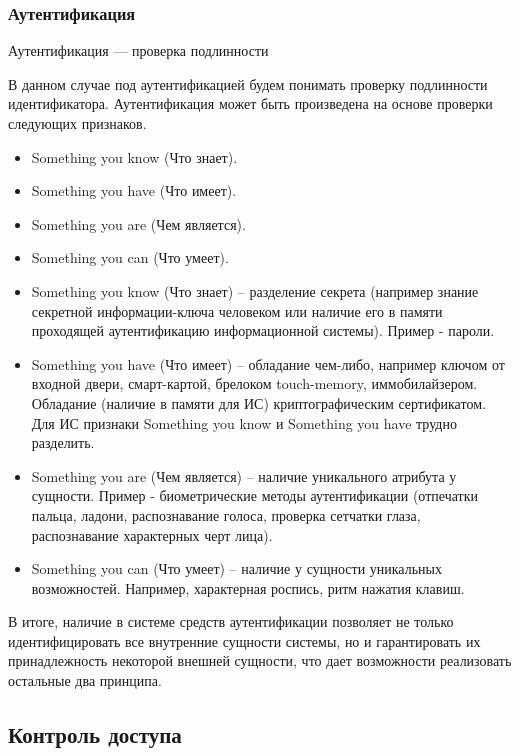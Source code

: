 \begin{frame}
\frametitle{Аутентификация}
\begin{definition}%
\alert{Аутентификация} --- проверка подлинности
\end{definition}
В данном случае под аутентификацией будем понимать проверку подлинности идентификатора. Аутентификация может быть произведена на основе проверки следующих признаков.
\begin{itemize}
    \item Something you know (Что знает).
    \item Something you have (Что имеет).
    \item Something you are (Чем является).
    \item Something you can (Что умеет).
\end{itemize}
\end{frame}


\begin{itemize}
\item Something you know (Что знает) – разделение секрета (например знание секретной информации-ключа человеком или наличие его в памяти проходящей аутентификацию информационной системы). Пример - пароли.
\item Something you have (Что имеет) – обладание чем-либо, например ключом от входной двери, смарт-картой, брелоком touch-memory, иммобилайзером. Обладание (наличие в памяти для ИС) криптографическим сертификатом. Для ИС признаки Something you know и Something you have трудно разделить.
\item Something you are (Чем является) – наличие уникального атрибута у сущности. Пример - биометрические методы аутентификации (отпечатки пальца, ладони, распознавание голоса, проверка сетчатки глаза, распознавание характерных черт лица).
\item Something you can (Что умеет) – наличие у сущности уникальных возможностей. Например, характерная роспись, ритм нажатия клавиш.
\end{itemize}

В итоге, наличие в системе средств аутентификации позволяет не только идентифицировать все внутренние сущности системы, но и гарантировать их принадлежность некоторой внешней сущности, что дает возможности реализовать остальные два принципа.


\subsection{Контроль доступа}

